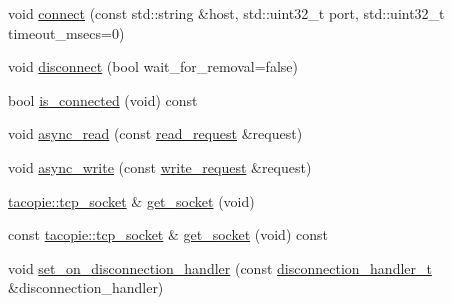 \begin{DoxyCompactItemize}
\item 
void \hyperlink{classtacopie_1_1tcp__client_a0cfbb18cb72aa3b6a41921f61cacc425}{connect} (const std\+::string \&host, std\+::uint32\+\_\+t port, std\+::uint32\+\_\+t timeout\+\_\+msecs=0)
\item 
void \hyperlink{classtacopie_1_1tcp__client_a7562e0bfa24912595d6f695f848b9e51}{disconnect} (bool wait\+\_\+for\+\_\+removal=false)
\item 
bool \hyperlink{classtacopie_1_1tcp__client_a9bf568812c8350260843842e7952c8c3}{is\+\_\+connected} (void) const
\item 
void \hyperlink{classtacopie_1_1tcp__client_a120e3ec2902acc902f7a0b27074bda6b}{async\+\_\+read} (const \hyperlink{structtacopie_1_1tcp__client_1_1read__request}{read\+\_\+request} \&request)
\item 
void \hyperlink{classtacopie_1_1tcp__client_a2304ed6d4ca0cbc74e6aa72d3e92b76a}{async\+\_\+write} (const \hyperlink{structtacopie_1_1tcp__client_1_1write__request}{write\+\_\+request} \&request)
\item 
\hyperlink{classtacopie_1_1tcp__socket}{tacopie\+::tcp\+\_\+socket} \& \hyperlink{classtacopie_1_1tcp__client_a1a3834deb1d263ec5816066f74286298}{get\+\_\+socket} (void)
\item 
const \hyperlink{classtacopie_1_1tcp__socket}{tacopie\+::tcp\+\_\+socket} \& \hyperlink{classtacopie_1_1tcp__client_a9cf1f3ccf43f9a0a883a17b15e3668d6}{get\+\_\+socket} (void) const
\item 
void \hyperlink{classtacopie_1_1tcp__client_a8c290d681186edb0578051c04f3c0762}{set\+\_\+on\+\_\+disconnection\+\_\+handler} (const \hyperlink{classtacopie_1_1tcp__client_aca5df52e5ee6fa673cf212532ada1453}{disconnection\+\_\+handler\+\_\+t} \&disconnection\+\_\+handler)
\end{DoxyCompactItemize}
